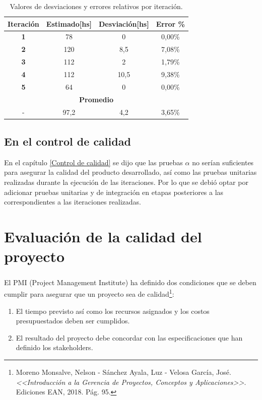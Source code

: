 \documentclass[a4paper, 12pt,twoside]{report}  %
\numberwithin{equation}{subsection} %
\begin{document}
\begin{table}[h!]
	\centering
	\captionsetup{justification=centering,margin=1.5cm}
	\begin{tabular}{ |c|c|c|c| }
		\hline
		\textbf{Iteración} & \textbf{Estimado[hs]} & \textbf{Desviación[hs]} & \textbf{Error \%} \\
		\hline
		\textbf{1} & 78 & 0 & 0,00\% \\
		\hline
		\textbf{2} & 120 & 8,5 & 7,08\% \\
		\hline
		\textbf{3} & 112 & 2 & 1,79\% \\
		\hline
		\textbf{4} & 112 & 10,5 & 9,38\% \\
		\hline
		\textbf{5} & 64 & 0 & 0,00\% \\
		\hline
		\multicolumn{4}{|c|}{\textbf{Promedio}} \\
		\hline
		\multicolumn{1}{|c|}{-} & 97,2 & 4,2 & 3,65\% \\
		\hline
	\end{tabular}
	\caption{Valores de desviaciones y errores relativos por iteración.}
	\label{tabla_estadisticas_desviaciones}
\end{table}

\section{En el control de calidad}
En el capítulo \ref{Control de calidad} se dijo que las pruebas \begin{math}\alpha\end{math} no serían suficientes para asegurar la calidad del producto desarrollado, así como las pruebas unitarias realizadas durante la ejecución de las iteraciones. Por lo que se debió optar por adicionar pruebas unitarias y de integración en etapas posteriores a las correspondientes a las iteraciones realizadas.

\chapter{Evaluación de la calidad del proyecto}

El PMI\textsuperscript{\tiny\textregistered} (Project Management Institute) ha definido dos condiciones que se deben cumplir para asegurar que un proyecto sea de calidad\footnote{Moreno Monsalve, Nelson - Sánchez Ayala, Luz - Velosa García, José. \textit{<<Introducción a la Gerencia de Proyectos, Conceptos y Aplicaciones>>}. Ediciones EAN, 2018. Pág. 95.}:
\begin{enumerate}
\item El tiempo previsto así como los recursos asignados y los costos presupuestados deben ser cumplidos.
\item El resultado del proyecto debe concordar con las especificaciones que han definido los stakeholders.
\end{enumerate}
\end{document}
